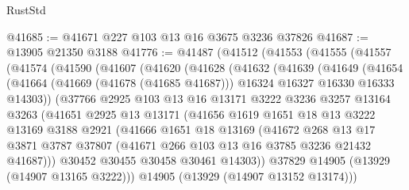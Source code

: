 \begin{lexlean}{RustStd}
\begin{coremodule}
@41685 := @41671 @227 @103 @13 @16 @3675 @3236 @37826
@41687 := @13905 @21350 @3188
@41776 := @41487
    (@41512
      (@41553
        (@41555
          (@41557
            (@41574
              (@41590
                (@41607
                  (@41620
                    (@41628
                      (@41632
                        (@41639
                          (@41649
                            (@41654
                              (@41664
                                (@41669 (@41678 (@41685 @41687)))
                                @16324
                                @16327
                                @16330
                                @16333
                                @14303))
                            (@37766
                              @2925
                              @103
                              @13
                              @16
                              @13171
                              @3222
                              @3236
                              @3257
                              @13164
                              @3263
                              (@41651
                                @2925
                                @13
                                @13171
                                (@41656
                                  @1619
                                  @1651
                                  @18
                                  @13
                                  @3222
                                  @13169
                                  @3188
                                  @2921
                                  (@41666
                                    @1651
                                    @18
                                    @13169
                                    (@41672
                                      @268
                                      @13
                                      @17
                                      @3871
                                      @3787
                                      @37807
                                      (@41671 @266 @103 @13 @16 @3785 @3236 @21432 @41687)))
                                  @30452
                                  @30455
                                  @30458
                                  @30461
                                  @14303))
                              @37829
                              @14905
                              (@13929 (@14907 @13165 @3222)))
                            @14905
                            (@13929 (@14907 @13152 @13174)))

\end{coremodule}
\end{lexlean}
